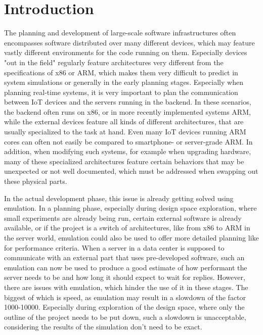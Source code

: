 
\chapter{Introduction}
The planning and development of large-scale software infrastructures often encompasses software distributed over many different devices,
which may feature vastly different environments for the code running on them.
Especially devices "out in the field" regularly feature architectures very different from the specifications of x86 or ARM,
which makes them very difficult to predict in system simulations or generally in the early planning stages.
Especially when planning real-time systems,
it is very important to plan the communication between IoT devices and the servers running in the backend.
In these scenarios, the backend often runs on x86, or in more recently implemented systems ARM,
while the external devices feature all kinds of different architectures,
that are usually specialized to the task at hand.
Even many IoT devices running ARM cores can often not easily be compared to smartphone- or server-grade ARM.
In addition, when modifying such systems, for example when upgrading hardware,
many of these specialized architectures feature certain behaviors that may be unexpected or not well documented,
which must be addressed when swapping out these physical parts.

In the actual development phase, this issue is already getting solved using emulation.
In a planning phase, especially during design space exploration, where small experiments are already being run,
certain external software is already available, or if the project is a switch of architectures,
like from x86 to ARM in the server world,
emulation could also be used to offer more detailed planning
like for performance criteria.
When a server in a data center is supposed to communicate with an external part that uses pre-developed software,
such an emulation can now be used to produce a good estimate of how performant the server needs to be and how long it should expect to wait for replies.
However, there are issues with emulation, which hinder the use of it in these stages.
The biggest of which is speed, as emulation may result in a slowdown of the factor 1000-10000\cite{slowdown}.
Especially during exploration of the design space, where only the outline of the project needs to be put down,
such a slowdown is unacceptable, considering the results of the simulation don't need to be exact.

